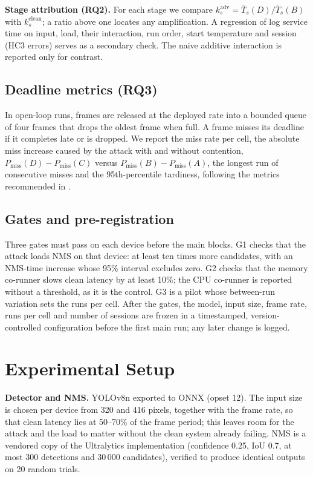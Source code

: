 \documentclass[conference]{IEEEtran}
\begin{document}
\textbf{Stage attribution (RQ2).} For each stage we compare $k_s^{\text{adv}}=\bar T_s(D)/\bar
T_s(B)$ with $k_s^{\text{clean}}$; a ratio above one locates any amplification. A regression of
log service time on input, load, their interaction, run order, start temperature and session
(HC3 errors) serves as a secondary check. The naive additive interaction is reported only for
contrast.

\subsection{Deadline metrics (RQ3)}
In open-loop runs, frames are released at the deployed rate into a bounded queue of four frames
that drops the oldest frame when full. A frame misses its deadline if it completes late or is
dropped. We report the miss rate per cell, the absolute miss increase caused by the attack with
and without contention, $P_\text{miss}(D)-P_\text{miss}(C)$ versus $P_\text{miss}(B)-P_\text{miss}(A)$,
the longest run of consecutive misses and the 95th-percentile tardiness, following the metrics
recommended in \cite{gu2026survey}.

\subsection{Gates and pre-registration}
Three gates must pass on each device before the main blocks. G1 checks that the attack loads NMS
on that device: at least ten times more candidates, with an NMS-time increase whose 95\% interval
excludes zero. G2 checks that the memory co-runner slows clean latency by at least 10\%; the CPU
co-runner is reported without a threshold, as it is the control. G3 is a pilot whose between-run
variation sets the runs per cell. After the gates, the model, input size, frame rate, runs per
cell and number of sessions are frozen in a timestamped, version-controlled configuration before
the first main run; any later change is logged.

\section{Experimental Setup}\label{sec:setup}
\textbf{Detector and NMS.} YOLOv8n \cite{jocher2023ultralytics} exported to ONNX (opset 12). The
input size is chosen per device from 320 and 416 pixels, together with the frame rate, so that
clean latency lies at 50--70\% of the frame period; this leaves room for the attack and the load
to matter without the clean system already failing. NMS is a vendored copy of the Ultralytics
implementation (confidence 0.25, IoU 0.7, at most 300 detections and 30\,000 candidates),
verified to produce identical outputs on 20 random trials.
\end{document}
